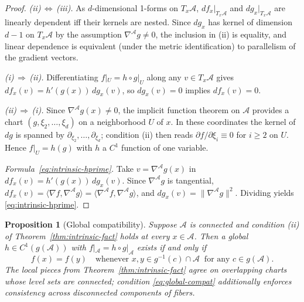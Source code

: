 \documentclass{article}
\newtheorem{proposition}{Proposition}
\begin{document}
\begin{proof}
\textit{(ii)\,$\Leftrightarrow$\,(iii).} As $d$-dimensional 1-forms on
$T_x\mathcal{A}$, $df_x|_{T_x\mathcal{A}}$ and $dg_x|_{T_x\mathcal{A}}$
are linearly dependent iff their kernels are nested. Since $dg_x$ has
kernel of dimension $d-1$ on $T_x\mathcal{A}$ by the assumption
$\nabla^{\!\mathcal{A}} g \neq 0$, the inclusion in (ii) is equality, and
linear dependence is equivalent (under the metric identification) to
parallelism of the gradient vectors.

\textit{(i)\,$\Rightarrow$\,(ii).} Differentiating $f|_U =
h\circ g|_U$ along any $v\in T_x\mathcal{A}$ gives
$df_x(v) = h'(g(x))\,dg_x(v)$, so $dg_x(v)=0$ implies $df_x(v)=0$.

\textit{(ii)\,$\Rightarrow$\,(i).} Since $\nabla^{\!\mathcal{A}} g(x)\neq 0$,
the implicit function theorem on $\mathcal{A}$ provides a chart
$(g,\xi_2,\dots,\xi_d)$ on a neighborhood $U$ of $x$. In these coordinates
the kernel of $dg$ is spanned by $\partial_{\xi_2},\dots,\partial_{\xi_d}$;
condition (ii) then reads $\partial f/\partial\xi_i\equiv 0$ for $i\ge 2$
on $U$. Hence $f|_U = h(g)$ with $h$ a $C^1$ function of one variable.

\textit{Formula~\eqref{eq:intrinsic-hprime}.} Take
$v=\nabla^{\!\mathcal{A}} g(x)$ in $df_x(v) = h'(g(x))\,dg_x(v)$. Since
$\nabla^{\!\mathcal{A}} g$ is tangential, $df_x(v) =
\langle\nabla f, \nabla^{\!\mathcal{A}} g\rangle =
\langle\nabla^{\!\mathcal{A}} f, \nabla^{\!\mathcal{A}} g\rangle$, and
$dg_x(v) = \|\nabla^{\!\mathcal{A}} g\|^2$. Dividing yields
\eqref{eq:intrinsic-hprime}.
\end{proof}

\begin{proposition}[Global compatibility]
\label{prop:global}
Suppose $\mathcal{A}$ is connected and condition (ii) of
Theorem~\ref{thm:intrinsic-fact} holds at every $x\in\mathcal{A}$. Then
a global $h\in C^1(g(\mathcal{A}))$ with
$f|_{\mathcal{A}} = h\circ g|_{\mathcal{A}}$ exists if and only if
\begin{equation}
\label{eq:global-compat}
  f(x) = f(y) \quad \text{whenever } x,y \in g^{-1}(c)\cap\mathcal{A}
                \ \text{ for any } c \in g(\mathcal{A}).
\end{equation}
The local pieces from Theorem~\ref{thm:intrinsic-fact} agree on
overlapping charts whose level sets are connected; condition
\eqref{eq:global-compat} additionally enforces consistency across
disconnected components of fibers.
\end{proposition}
\end{document}
